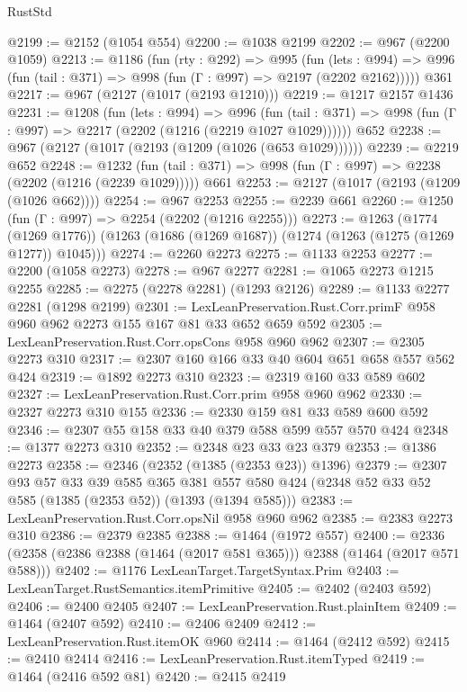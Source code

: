 \begin{lexlean}{RustStd}
\begin{coremodule}
@2199 := @2152 (@1054 @554)
@2200 := @1038 @2199
@2202 := @967 (@2200 @1059)
@2213 := @1186
    (fun (rty : @292) =>
    @995
      (fun (lets : @994) =>
      @996 (fun (tail : @371) => @998 (fun (Γ : @997) => @2197 (@2202 @2162)))))
    @361
@2217 := @967 (@2127 (@1017 (@2193 @1210)))
@2219 := @1217 @2157 @1436
@2231 := @1208
    (fun (lets : @994) =>
    @996 (fun (tail : @371) => @998 (fun (Γ : @997) => @2217 (@2202 (@1216 (@2219 @1027 @1029))))))
    @652
@2238 := @967 (@2127 (@1017 (@2193 (@1209 (@1026 (@653 @1029))))))
@2239 := @2219 @652
@2248 := @1232
    (fun (tail : @371) => @998 (fun (Γ : @997) => @2238 (@2202 (@1216 (@2239 @1029)))))
    @661
@2253 := @2127 (@1017 (@2193 (@1209 (@1026 @662))))
@2254 := @967 @2253
@2255 := @2239 @661
@2260 := @1250 (fun (Γ : @997) => @2254 (@2202 (@1216 @2255)))
@2273 := @1263
    (@1774 (@1269 @1776))
    (@1263 (@1686 (@1269 @1687)) (@1274 (@1263 (@1275 (@1269 @1277)) @1045)))
@2274 := @2260 @2273
@2275 := @1133 @2253
@2277 := @2200 (@1058 @2273)
@2278 := @967 @2277
@2281 := @1065 @2273 @1215 @2255
@2285 := @2275 (@2278 @2281) (@1293 @2126)
@2289 := @1133 @2277 @2281 (@1298 @2199)
@2301 := LexLeanPreservation.Rust.Corr.primF @958 @960 @962 @2273 @155 @167 @81 @33 @652 @659 @592
@2305 := LexLeanPreservation.Rust.Corr.opsCons @958 @960 @962
@2307 := @2305 @2273 @310
@2317 := @2307 @160 @166 @33 @40 @604 @651 @658 @557 @562 @424
@2319 := @1892 @2273 @310
@2323 := @2319 @160 @33 @589 @602
@2327 := LexLeanPreservation.Rust.Corr.prim @958 @960 @962
@2330 := @2327 @2273 @310 @155
@2336 := @2330 @159 @81 @33 @589 @600 @592
@2346 := @2307 @55 @158 @33 @40 @379 @588 @599 @557 @570 @424
@2348 := @1377 @2273 @310
@2352 := @2348 @23 @33 @23 @379
@2353 := @1386 @2273
@2358 := @2346 (@2352 (@1385 (@2353 @23)) @1396)
@2379 := @2307
    @93
    @57
    @33
    @39
    @585
    @365
    @381
    @557
    @580
    @424
    (@2348 @52 @33 @52 @585 (@1385 (@2353 @52)) (@1393 (@1394 @585)))
@2383 := LexLeanPreservation.Rust.Corr.opsNil @958 @960 @962
@2385 := @2383 @2273 @310
@2386 := @2379 @2385
@2388 := @1464 (@1972 @557)
@2400 := @2336 (@2358 (@2386 @2388 (@1464 (@2017 @581 @365))) @2388 (@1464 (@2017 @571 @588)))
@2402 := @1176 LexLeanTarget.TargetSyntax.Prim
@2403 := LexLeanTarget.RustSemantics.itemPrimitive
@2405 := @2402 (@2403 @592)
@2406 := @2400 @2405
@2407 := LexLeanPreservation.Rust.plainItem
@2409 := @1464 (@2407 @592)
@2410 := @2406 @2409
@2412 := LexLeanPreservation.Rust.itemOK @960
@2414 := @1464 (@2412 @592)
@2415 := @2410 @2414
@2416 := LexLeanPreservation.Rust.itemTyped
@2419 := @1464 (@2416 @592 @81)
@2420 := @2415 @2419

\end{coremodule}
\end{lexlean}
